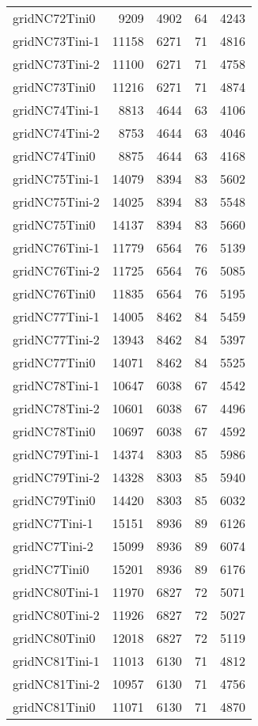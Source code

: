 \begin{longtable}{lrrrr}
gridNC72Tini0 & 9209 & 4902 & 64 & 4243 \\
gridNC73Tini-1 & 11158 & 6271 & 71 & 4816 \\
gridNC73Tini-2 & 11100 & 6271 & 71 & 4758 \\
gridNC73Tini0 & 11216 & 6271 & 71 & 4874 \\
gridNC74Tini-1 & 8813 & 4644 & 63 & 4106 \\
gridNC74Tini-2 & 8753 & 4644 & 63 & 4046 \\
gridNC74Tini0 & 8875 & 4644 & 63 & 4168 \\
gridNC75Tini-1 & 14079 & 8394 & 83 & 5602 \\
gridNC75Tini-2 & 14025 & 8394 & 83 & 5548 \\
gridNC75Tini0 & 14137 & 8394 & 83 & 5660 \\
gridNC76Tini-1 & 11779 & 6564 & 76 & 5139 \\
gridNC76Tini-2 & 11725 & 6564 & 76 & 5085 \\
gridNC76Tini0 & 11835 & 6564 & 76 & 5195 \\
gridNC77Tini-1 & 14005 & 8462 & 84 & 5459 \\
gridNC77Tini-2 & 13943 & 8462 & 84 & 5397 \\
gridNC77Tini0 & 14071 & 8462 & 84 & 5525 \\
gridNC78Tini-1 & 10647 & 6038 & 67 & 4542 \\
gridNC78Tini-2 & 10601 & 6038 & 67 & 4496 \\
gridNC78Tini0 & 10697 & 6038 & 67 & 4592 \\
gridNC79Tini-1 & 14374 & 8303 & 85 & 5986 \\
gridNC79Tini-2 & 14328 & 8303 & 85 & 5940 \\
gridNC79Tini0 & 14420 & 8303 & 85 & 6032 \\
gridNC7Tini-1 & 15151 & 8936 & 89 & 6126 \\
gridNC7Tini-2 & 15099 & 8936 & 89 & 6074 \\
gridNC7Tini0 & 15201 & 8936 & 89 & 6176 \\
gridNC80Tini-1 & 11970 & 6827 & 72 & 5071 \\
gridNC80Tini-2 & 11926 & 6827 & 72 & 5027 \\
gridNC80Tini0 & 12018 & 6827 & 72 & 5119 \\
gridNC81Tini-1 & 11013 & 6130 & 71 & 4812 \\
gridNC81Tini-2 & 10957 & 6130 & 71 & 4756 \\
gridNC81Tini0 & 11071 & 6130 & 71 & 4870 \\

\end{longtable}
